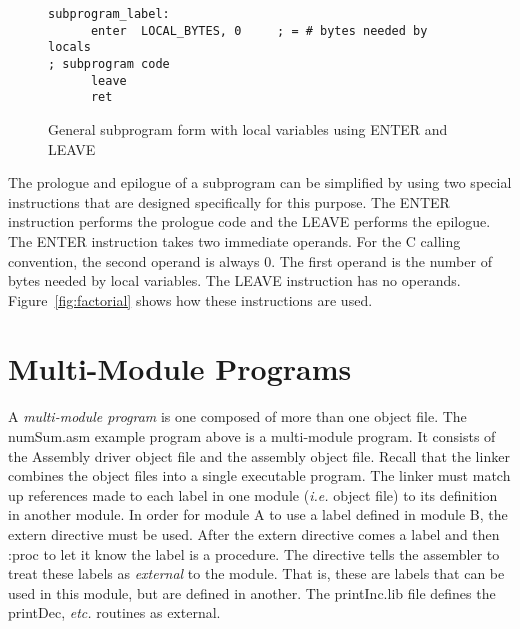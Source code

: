 \begin{figure}[t]
 \begin{lstlisting}[language={[x86masm]Assembler}]
subprogram_label:
      enter  LOCAL_BYTES, 0     ; = # bytes needed by locals
; subprogram code
      leave
      ret
 \end{lstlisting}
\caption{General subprogram form with local variables using 
{\code ENTER} and {\code LEAVE}\label{fig:subskel3}}
\end{figure}

The prologue and epilogue of a subprogram can be simplified by using
two special instructions that are designed specifically for this
purpose. The {\code ENTER} instruction performs the prologue code and the
{\code LEAVE} performs the epilogue. The {\code ENTER} instruction
takes two immediate operands. For the C calling convention, the second
operand is always 0. The first operand is the number of bytes needed by
local variables. The {\code LEAVE} instruction has no
operands. Figure~\ref{fig:factorial} shows how these instructions are
used. 

\section{Multi-Module Programs}

A \emph{multi-module program} is one composed of more than one object
file.  The numSum.asm example program above is a multi-module
program. It consists of the Assembly driver object file and the assembly
object file. Recall that the linker
combines the object files into a single executable program. The linker
must match up references made to each label in one module (\emph{i.e.}
object file) to its definition in another module. In order for module
A to use a label defined in module B, the {\code extern} directive
must be used. After the {\code extern} 
directive comes a label and then {\code :proc} to let it know the label is a procedure. 
The directive tells the assembler to treat these labels as \emph{external} to the
module. That is, these are labels that can be used in this module, but
are defined in another. The {\code printInc.lib} file defines the
{\code printDec}, \emph{etc.} routines as external.

